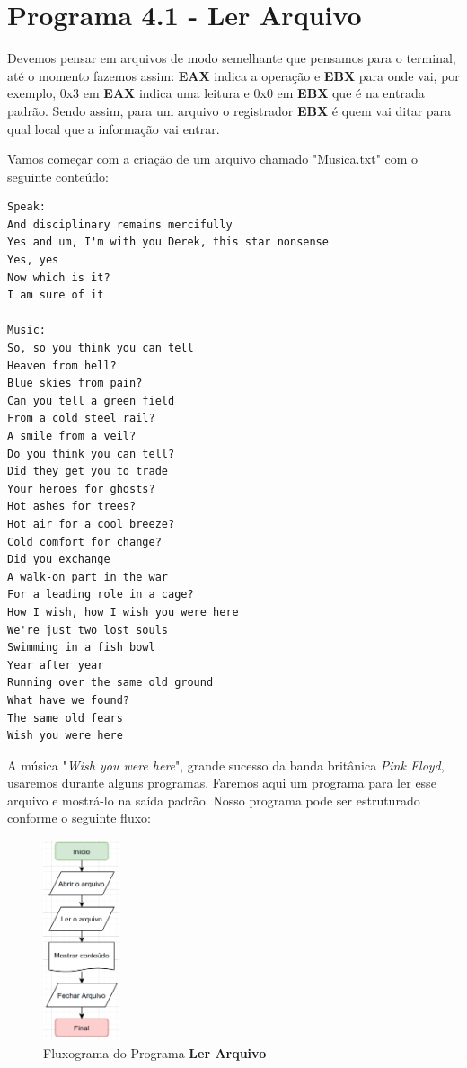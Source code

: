 \section{Programa 4.1 - Ler Arquivo}
Devemos pensar em arquivos de modo semelhante que pensamos para o terminal, até o momento fazemos assim: \textbf{EAX} indica a operação e \textbf{EBX} para onde vai, por exemplo, 0x3 em \textbf{EAX} indica uma leitura e 0x0 em \textbf{EBX} que é na entrada padrão. Sendo assim, para um arquivo o registrador \textbf{EBX} é quem vai ditar para qual local que a informação vai entrar.

Vamos começar com a criação de um arquivo chamado "Musica.txt" com o seguinte conteúdo:
\begin{lstlisting}[]
Speak:
And disciplinary remains mercifully
Yes and um, I'm with you Derek, this star nonsense
Yes, yes
Now which is it?
I am sure of it

Music:
So, so you think you can tell
Heaven from hell?
Blue skies from pain?
Can you tell a green field
From a cold steel rail?
A smile from a veil?
Do you think you can tell?
Did they get you to trade
Your heroes for ghosts?
Hot ashes for trees?
Hot air for a cool breeze?
Cold comfort for change?
Did you exchange
A walk-on part in the war
For a leading role in a cage?
How I wish, how I wish you were here
We're just two lost souls
Swimming in a fish bowl
Year after year
Running over the same old ground
What have we found?
The same old fears
Wish you were here
\end{lstlisting}	

A música "\textit{Wish you were here}", grande sucesso da banda britânica \textit{Pink Floyd}, usaremos durante alguns programas. Faremos aqui um programa para ler esse arquivo e mostrá-lo na saída padrão. Nosso programa pode ser estruturado conforme o seguinte fluxo:
\begin{figure}[H]
	\centering
	\includegraphics[width=0.2\textwidth]{Pictures/cap04/programa41}
	\caption{Fluxograma do Programa \textbf{Ler Arquivo}}
\end{figure}

